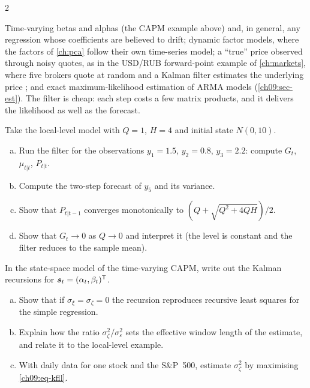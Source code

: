 \begin{paracol}{2}
\begin{finance}
Time-varying betas and alphas (the CAPM example above) and, in general, any regression whose coefficients are believed to drift; dynamic factor models, where the factors of
\cref{ch:pca} follow their own time-series model; a ``true'' price observed through noisy quotes, as in the USD/RUB forward-point example of \cref{ch:markets}, where five
brokers quote at random and a Kalman filter estimates the underlying price ; and exact maximum-likelihood estimation of ARMA models
(\cref{ch09:sec-est}). The filter is cheap: each step costs a few matrix products, and it delivers the likelihood as well as the forecast.
\end{finance}

\begin{exercise}\label{ch09:ex-x-kf}
Take the local-level model with $Q=1$, $H=4$ and initial state $N(0,10)$.
\begin{enumerate}[(a)]
  \item Run the filter for the observations $y_1=1.5$, $y_2=0.8$, $y_3=2.2$: compute $G_t$, $\mu_{t|t}$, $P_{t|t}$.
  \item Compute the two-step forecast of $y_5$ and its variance.
  \item Show that $P_{t|t-1}$ converges monotonically to
      $(Q+\sqrt{Q^2+4QH})/2$.
  \item Show that $G_t\to0$ as $Q\to0$ and interpret it (the level is constant and the filter reduces to the sample mean).
\end{enumerate}
\end{exercise}

\begin{exercise}\label{ch09:ex-x-beta}
In the state-space model of the time-varying CAPM, write out the Kalman recursions for $\bm s_t=(\alpha_t,\beta_t)^{\mathsf T}$.
\begin{enumerate}[(a)]
  \item Show that if $\sigma_\xi=\sigma_\zeta=0$ the recursion reproduces recursive least squares for the simple regression.
  \item Explain how the ratio
      $\sigma_\zeta^2/\sigma_\varepsilon^2$ sets the effective window length of the estimate, and relate it to the local-level example.
  \item With daily data for one stock and the S\&P~500, estimate $\sigma_\zeta^2$ by maximising \eqref{ch09:eq-kfll}.
\end{enumerate}
\end{exercise}


\end{paracol}
